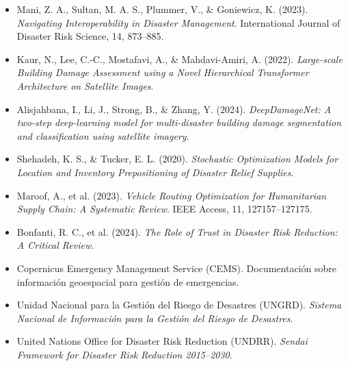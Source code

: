 \documentclass[11pt,a4paper]{article}
\begin{document}
\begin{itemize}[leftmargin=*]
  \item Mani, Z. A., Sultan, M. A. S., Plummer, V., \& Goniewicz, K. (2023).
        \emph{Navigating Interoperability in Disaster Management}.
        International Journal of Disaster Risk Science, 14, 873--885.
  \item Kaur, N., Lee, C.-C., Mostafavi, A., \& Mahdavi-Amiri, A. (2022).
        \emph{Large-scale Building Damage Assessment using a Novel
        Hierarchical Transformer Architecture on Satellite Images}.
  \item Alisjahbana, I., Li, J., Strong, B., \& Zhang, Y. (2024).
        \emph{DeepDamageNet: A two-step deep-learning model for
        multi-disaster building damage segmentation and classification using
        satellite imagery}.
  \item Shehadeh, K. S., \& Tucker, E. L. (2020). \emph{Stochastic
        Optimization Models for Location and Inventory Prepositioning of
        Disaster Relief Supplies}.
  \item Maroof, A., et al. (2023). \emph{Vehicle Routing Optimization for
        Humanitarian Supply Chain: A Systematic Review}. IEEE Access, 11,
        127157--127175.
  \item Bonfanti, R. C., et al. (2024). \emph{The Role of Trust in Disaster
        Risk Reduction: A Critical Review}.
  \item Copernicus Emergency Management Service (CEMS). Documentación sobre
        información geoespacial para gestión de emergencias.
  \item Unidad Nacional para la Gestión del Riesgo de Desastres (UNGRD).
        \emph{Sistema Nacional de Información para la Gestión del Riesgo de
        Desastres}.
  \item United Nations Office for Disaster Risk Reduction (UNDRR).
        \emph{Sendai Framework for Disaster Risk Reduction 2015--2030}.
\end{itemize}
\end{document}
